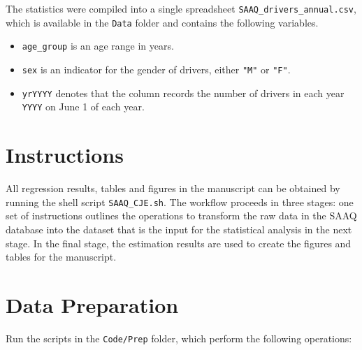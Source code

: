 \documentclass[11pt]{paper}
\begin{document}
The statistics were compiled into a single spreadsheet
\texttt{SAAQ\_drivers\_annual.csv}, 
which is available in the \texttt{Data} folder
and contains the following variables. 


\begin{itemize}

\item \texttt{age\_group} is an age range in years.
\item \texttt{sex} is an indicator for the gender of drivers, 
  either \texttt{"M"} or \texttt{"F"}.
\item \texttt{yrYYYY} denotes that the column records the number of drivers in each year \texttt{YYYY} on June 1 of each year.

\end{itemize}


\section*{Instructions}

All regression results, tables and figures in the manuscript
can be obtained by running the shell script \texttt{SAAQ\_CJE.sh}. 
The workflow proceeds in three stages: 
one set of instructions outlines the operations 
to transform the raw data in the 
SAAQ database into the dataset that is the input 
for the statistical analysis
in the next stage. 
In the final stage, the estimation results 
are used to create the figures and tables for the manuscript. 


\section*{Data Preparation}

Run the scripts in the \texttt{Code/Prep} folder, which 
perform the following operations:
\end{document}
